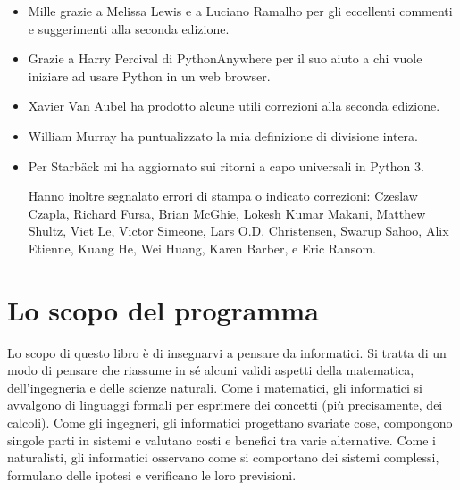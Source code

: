 \documentclass[10pt]{book}
\begin{document}
\begin{itemize}
\item Mille grazie a Melissa Lewis e a Luciano Ramalho per gli eccellenti commenti e suggerimenti alla seconda edizione.

\item Grazie a Harry Percival di PythonAnywhere per il suo aiuto a chi vuole iniziare ad usare Python in un web browser.

\item Xavier Van Aubel ha prodotto alcune utili correzioni alla seconda edizione.

\item William Murray ha puntualizzato la mia definizione di divisione intera.

\item Per Starb{\"a}ck mi ha aggiornato sui ritorni a capo universali in Python 3.


Hanno inoltre segnalato errori di stampa o indicato correzioni:
Czeslaw Czapla, Richard Fursa, Brian McGhie, Lokesh Kumar Makani, Matthew Shultz, Viet Le, Victor Simeone, Lars O.D. Christensen, Swarup Sahoo, Alix Etienne, Kuang He, Wei Huang, Karen Barber, e Eric Ransom.

\end{itemize}

\normalsize
\clearemptydoublepage

\begin{latexonly}

\tableofcontents

\clearemptydoublepage

\end{latexonly}

\mainmatter

\chapter{Lo scopo del programma}

Lo scopo di questo libro è di insegnarvi a pensare da informatici. Si tratta di un modo di pensare che riassume in sé alcuni validi aspetti della matematica, dell'ingegneria e delle scienze naturali. Come i matematici, gli informatici si avvalgono di linguaggi formali per esprimere dei concetti (più precisamente, dei calcoli). Come gli ingegneri, gli informatici progettano svariate cose, compongono singole parti in sistemi e valutano costi e benefici tra varie alternative. Come i naturalisti, gli informatici osservano come si comportano dei sistemi complessi, formulano delle ipotesi e verificano le loro previsioni.
\end{document}
